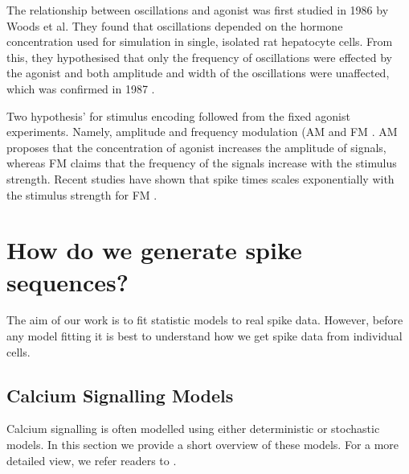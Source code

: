 \documentclass[../main.tex]{subfiles}
\begin{document}
The relationship between  oscillations and agonist was first studied in 1986 by Woods et al. \cite{Woods_1986} They found that  oscillations depended on the hormone concentration used for simulation in single, isolated rat hepatocyte cells. From this, they hypothesised that only the frequency of  oscillations were effected by the agonist and both amplitude and width of the oscillations were unaffected, which was confirmed in 1987 \cite{Woods_1987}. 


Two hypothesis' for stimulus encoding followed from the fixed agonist experiments. Namely, amplitude and frequency modulation (AM and FM \cite{Berridge_1997}. AM proposes that the concentration of agonist increases the amplitude of  signals, whereas FM claims that the frequency of the  signals increase with the stimulus strength. Recent studies have shown that  spike times scales exponentially with the stimulus strength for FM \cite{Thurley_2014}.

\section{How do we generate spike sequences?} %
The aim of our work is to fit statistic models to real spike data. However, before any model fitting it is best to understand how we get spike data from individual cells. 


\subsection{Calcium Signalling Models}
Calcium signalling is often modelled using either deterministic or stochastic models. In this section we provide a short overview of these models. For a more detailed view, we refer readers to \cite{Sneyd_2005, Falcke_2004, Dupont_2011, Thul_2008, Dupont_2016}. 
\end{document}
